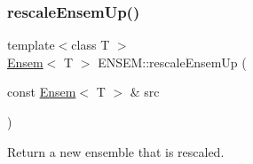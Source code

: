 \subsubsection{\texorpdfstring{rescaleEnsemUp()}{rescaleEnsemUp()}}
{\footnotesize\ttfamily template$<$class T $>$ \\
\mbox{\hyperlink{classENSEM_1_1Ensem}{Ensem}}$<$ T $>$ E\+N\+S\+E\+M\+::rescale\+Ensem\+Up (\begin{DoxyParamCaption}\item[{const \mbox{\hyperlink{classENSEM_1_1Ensem}{Ensem}}$<$ T $>$ \&}]{src }\end{DoxyParamCaption})\hspace{0.3cm}{\ttfamily [inline]}}



Return a new ensemble that is rescaled. 

